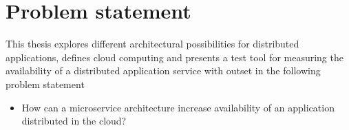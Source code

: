 \section{Problem statement}
\label{sc:problem_statement}

This thesis explores different architectural possibilities for distributed applications, defines cloud computing and presents a test tool for measuring the availability of a distributed application service with outset in the following problem statement

\begin{itemize}
\item How can a microservice architecture increase availability of an application distributed in the cloud?
\end{itemize}